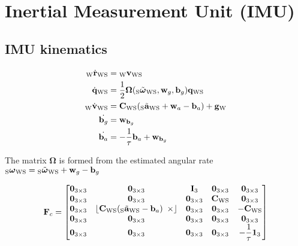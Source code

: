 \chapter{Inertial Measurement Unit (IMU)}


\section{IMU kinematics}

\begin{align}
  \DotPos{\world}{\sensor} &= \Vel{\world}{\sensor} \\
  \DotQuat{\world}{\sensor} &=
    \dfrac{1}{2} \mathbf{\Omega}
    (\imuGyroMeas, \noiseGyro, \biasGyro)
    \Quat{\world}{\sensor} \\
  \DotVel{\world}{\sensor} &=
    \Rot{\world}{\sensor}
    (\imuAccelMeas + \noiseAccel - \biasAccel) + \gravity \\
  \dot{\biasGyro} &= \noise_{\biasGyro} \\
  \dot{\biasAccel} &= - \dfrac{1}{\tau} \biasAccel + \noise_{\biasGyro}
\end{align}

The matrix $\mathbf{\Omega}$ is formed from the estimated angular rate
$\imuGyro = \imuGyroMeas + \noiseGyro - \biasGyro$

\begin{equation}
  \mathbf{F}_{c} = \begin{bmatrix}
    \Zeros{3}{3}
    & \Zeros{3}{3}
    & \I_{3}
    & \Zeros{3}{3}
    & \Zeros{3}{3} \\
    \Zeros{3}{3}
    & \Zeros{3}{3}
    & \Zeros{3}{3}
    & \Rot{\world}{\sensor}
    & \Zeros{3}{3} \\
    \Zeros{3}{3}
    & \Skew{\Rot{\world}{\sensor}(\imuAccelMeas - \biasAccel)}
    & \Zeros{3}{3}
    & \Zeros{3}{3}
    & -\Rot{\world}{\sensor} \\
    \Zeros{3}{3}
    & \Zeros{3}{3}
    & \Zeros{3}{3}
    & \Zeros{3}{3}
    & \Zeros{3}{3} \\
    \Zeros{3}{3}
    & \Zeros{3}{3}
    & \Zeros{3}{3}
    & \Zeros{3}{3}
    & -\dfrac{1}{\tau} \ones_{3}
  \end{bmatrix}
\end{equation}
